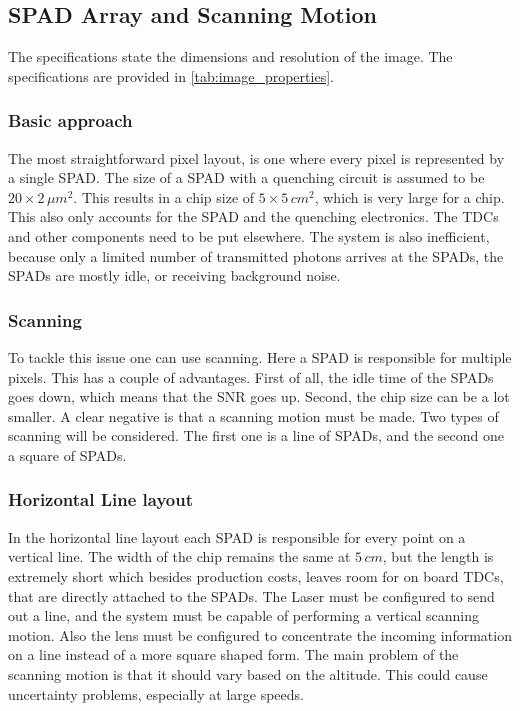 \subsection{SPAD Array and Scanning Motion}
The specifications state the dimensions and resolution of the image. The specifications are provided in \cref{tab:image_properties}.



\subsubsection*{Basic approach}
The most straightforward pixel layout, is one where every pixel is represented by a single SPAD. The size of a SPAD with a quenching circuit is assumed to be $20\times2\,\mu m^2$. This results in a chip size of $5\times5\, cm^2$, which is very large for a chip. This also only accounts for the SPAD and the quenching electronics. The TDCs and other components need to be put elsewhere. The system is also inefficient, because only a limited number of transmitted photons arrives at the SPADs, the SPADs are mostly idle, or receiving background noise. 

\subsubsection*{Scanning}
To tackle this issue one can use scanning. Here a SPAD is responsible for multiple pixels. This has a couple of advantages. First of all, the idle time of the SPADs goes down, which means that the SNR goes up. Second, the chip size can be a lot smaller. A clear negative is that a scanning motion must be made. Two types of scanning will be considered. The first one is a line of SPADs, and the second one a square of SPADs.

\subsubsection*{Horizontal Line layout}
In the horizontal line layout each SPAD is responsible for every point on a vertical line. The width of the chip remains the same at $5\,cm$, but the length is extremely short which besides production costs, leaves room for on board TDCs, that are directly attached to the SPADs. The Laser must be configured to send out a line, and the system must be capable of performing a vertical scanning motion. Also the lens must be configured to concentrate the incoming information on a line instead of a more square shaped form. The main problem of the scanning motion is that it should vary based on the altitude. This could cause uncertainty problems, especially at large speeds.


